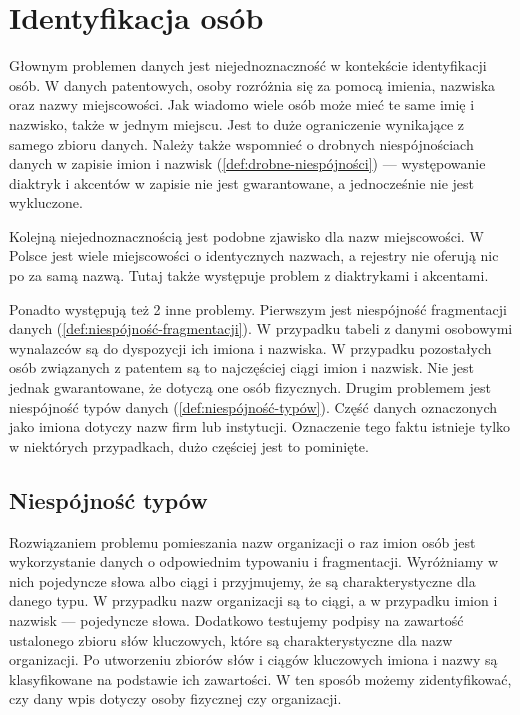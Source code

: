 \section{Identyfikacja osób}

Głownym problemen danych jest niejednoznaczność w kontekście identyfikacji osób.
W danych patentowych, osoby rozróżnia się za pomocą imienia, nazwiska
oraz nazwy miejscowości. Jak wiadomo wiele osób może mieć te same imię i nazwisko,
także w jednym miejscu. Jest to duże ograniczenie wynikające z samego zbioru danych.
Należy także wspomnieć o drobnych niespójnościach danych w zapisie imion i nazwisk
(\cref{def:drobne-niespójności}) --- występowanie diaktryk i akcentów w zapisie
nie jest gwarantowane, a jednocześnie nie jest wykluczone.

Kolejną niejednoznacznością jest podobne zjawisko dla nazw miejscowości.
W Polsce jest wiele miejscowości o identycznych nazwach, a rejestry nie oferują
nic po za samą nazwą. Tutaj także występuje problem z diaktrykami i akcentami.

Ponadto występują też 2 inne problemy. Pierwszym jest 
niespójność fragmentacji danych (\cref{def:niespójność-fragmentacji}).
W przypadku tabeli z danymi osobowymi wynalazców są do dyspozycji ich
imiona i nazwiska. W przypadku pozostałych osób związanych z patentem
są to najczęściej ciągi imion i nazwisk. Nie jest jednak gwarantowane,
że dotyczą one osób fizycznych. Drugim problemem jest niespójność 
typów danych (\cref{def:niespójność-typów}). Część danych oznaczonych
jako imiona dotyczy nazw firm lub instytucji. Oznaczenie tego faktu
istnieje tylko w niektórych przypadkach, dużo częściej jest to pominięte.



\subsection{Niespójność typów}

Rozwiązaniem problemu pomieszania nazw organizacji o raz imion osób
jest wykorzystanie danych o odpowiednim typowaniu i fragmentacji.
Wyróżniamy w nich pojedyncze słowa albo ciągi i przyjmujemy, 
że są charakterystyczne dla danego typu. W przypadku nazw organizacji
są to ciągi, a w przypadku imion i nazwisk --- pojedyncze słowa.
Dodatkowo testujemy podpisy na zawartość ustalonego zbioru słów
kluczowych, które są charakterystyczne dla nazw organizacji.
Po utworzeniu zbiorów słów i ciągów kluczowych imiona i nazwy
są klasyfikowane na podstawie ich zawartości. W ten sposób
możemy zidentyfikować, czy dany wpis dotyczy osoby fizycznej
czy organizacji.

